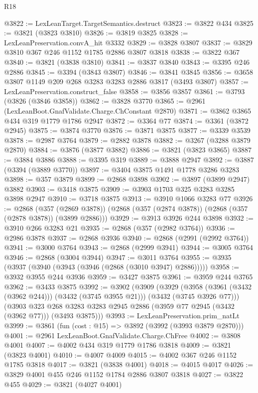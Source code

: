 \begin{lexlean}{R18}
\begin{coremodule}
{{{{{{{{{{{{{{{{{{{@3822 := LexLeanTarget.TargetSemantics.destruct
@3823 := @3822 @434
@3825 := @3821 (@3823 @3810)
@3826 := @3819 @3825
@3828 := LexLeanPreservation.convA_hit @3332
@3829 := @3828 @3807
@3837 := @3829 @3810 @367 @246 @1152 @1785 @2886 @3807 @3818
@3838 := @3822 @367
@3840 := @3821 (@3838 @3810)
@3841 := @3837 @3840
@3843 := @3395 @246 @2886
@3845 := @3394 (@3843 @3807)
@3846 := @3841 @3845
@3856 := @3658 @3807 @1149 @209 @268 @3283 @3283 @2886 @3817 (@3493 @3807)
@3857 := LexLeanPreservation.construct_false
@3858 := @3856 @3857
@3861 := @3793 (@3826 (@3846 @3858))
@3862 := @3828 @3770
@3865 := @2961 (LexLeanBoot.GnafValidate.Charge.ChConstant @2870)
@3871 := @3862 @3865 @434 @319 @1779 @1786 @2947
@3872 := @3364 @77
@3874 := @3361 (@3872 @2945)
@3875 := @3874 @3770
@3876 := @3871 @3875
@3877 := @3339 @3539
@3878 := @2987 @3764
@3879 := @2882 @3878
@3882 := @3267 (@3288 @3879 @2870)
@3884 := @3876 (@3877 @3882)
@3886 := @3821 (@3823 @3865)
@3887 := @3884 @3886
@3888 := @3395 @319
@3889 := @3888 @2947
@3892 := @3887 (@3394 (@3889 @3770))
@3897 := @3404 @3875 @1491 @1778 @3286 @3283
@3898 := @357 @3879
@3899 := @2868 @3898
@3902 := @3897 (@3899 @2947) @3882
@3903 := @3418 @3875
@3909 := @3903 @1703 @325 @3283 @3285 @3898 @2947
@3910 := @3718 @3875
@3913 := @3910 @1066 @3283 @77
@3926 := @2868
    (@357 (@2869 @3878))
    (@2868 (@357 (@2874 @3878)) (@2868 (@357 (@2878 @3878)) (@3899 @2886)))
@3929 := @3913 @3926 @244 @3898
@3932 := @3910 @266 @3283 @21
@3935 := @2868 (@357 (@2982 @3764))
@3936 := @2986 @3878
@3937 := @2868 @3936
@3940 := @2868 (@2991 (@2992 @3764))
@3941 := @3000 @3764
@3943 := @2868 (@2999 @3941)
@3944 := @3005 @3764
@3946 := @2868 (@3004 @3944)
@3947 := @3011 @3764
@3955 := @3935 (@3937 (@3940 (@3943 (@3946 (@2868 (@3010 @3947) @2886)))))
@3958 := @3932 @3955 @244 @3936
@3959 := @3427 @3875
@3961 := @3959 @244 @3765
@3962 := @3433 @3875
@3992 := @3902
    (@3909
      (@3929
        (@3958 (@3961 (@3432 (@3962 @244))) (@3432 (@3745 @3955 @21)))
        (@3432 (@3745 @3926 @77)))
      (@3903 @323 @268 @3283 @3283 @2945 @2886 (@3959 @77 @2945 (@3432 (@3962 @77))) (@3493 @3875)))
@3993 := LexLeanPreservation.prim_natLt
@3999 := @3861 (fun (cost : @15) => @3892 (@3992 (@3993 @3879 @2870)))
@4001 := @2961 LexLeanBoot.GnafValidate.Charge.ChFree
@4002 := @3808 @4001
@4007 := @4002 @434 @319 @1779 @1786 @3818
@4009 := @3821 (@3823 @4001)
@4010 := @4007 @4009
@4015 := @4002 @367 @246 @1152 @1785 @3818
@4017 := @3821 (@3838 @4001)
@4018 := @4015 @4017
@4026 := @3829 @4001 @455 @246 @1152 @1784 @2886 @3807 @3818
@4027 := @3822 @455
@4029 := @3821 (@4027 @4001)
}}}}}}}}}}}}}}}}}}}
\end{coremodule}
\end{lexlean}
